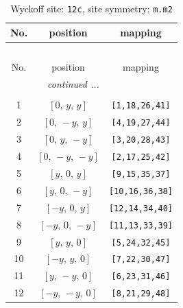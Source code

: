\documentclass[fleqn,8pt]{jsarticle}
\begin{document}
\begin{longtable}{ccc}
\caption{Wyckoff site: {\tt 12c}, site symmetry: {\tt m.m2}}
 \\
 \hline \hline
No. & position & mapping \\ \hline \endfirsthead

\multicolumn{2}{l}{\tablename\ \thetable{}} \\
 \hline \hline
No. & position & mapping \\ \hline \endhead

 \hline \hline
\multicolumn{2}{r}{\footnotesize\it continued ...} \\ \endfoot

 \hline \hline
\multicolumn{2}{r}{} \\ \endlastfoot

1 & $\left[ 0,\, y,\, y \right]$ & {\tt [1,18,26,41]} \\ \hline
2 & $\left[ 0,\, - y,\, y \right]$ & {\tt [4,19,27,44]} \\ \hline
3 & $\left[ 0,\, y,\, - y \right]$ & {\tt [3,20,28,43]} \\ \hline
4 & $\left[ 0,\, - y,\, - y \right]$ & {\tt [2,17,25,42]} \\ \hline
5 & $\left[ y,\, 0,\, y \right]$ & {\tt [9,15,35,37]} \\ \hline
6 & $\left[ y,\, 0,\, - y \right]$ & {\tt [10,16,36,38]} \\ \hline
7 & $\left[ - y,\, 0,\, y \right]$ & {\tt [12,14,34,40]} \\ \hline
8 & $\left[ - y,\, 0,\, - y \right]$ & {\tt [11,13,33,39]} \\ \hline
9 & $\left[ y,\, y,\, 0 \right]$ & {\tt [5,24,32,45]} \\ \hline
10 & $\left[ - y,\, y,\, 0 \right]$ & {\tt [7,22,30,47]} \\ \hline
11 & $\left[ y,\, - y,\, 0 \right]$ & {\tt [6,23,31,46]} \\ \hline
12 & $\left[ - y,\, - y,\, 0 \right]$ & {\tt [8,21,29,48]} \\
\end{longtable}
\renewcommand{\arraystretch}{1.2}
\end{document}
